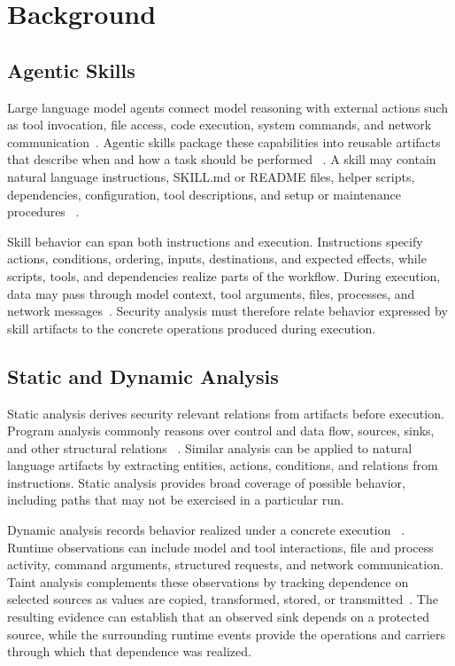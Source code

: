 \section{Background}

\subsection{Agentic Skills}

Large language model agents connect model reasoning with external actions such
as tool invocation, file access, code execution, system commands, and network
communication~\cite{yao2023react,schick2023toolformer,shen2023hugginggpt,
injecagent2024,asb2024}. Agentic skills package these capabilities into reusable
artifacts that describe when and how a task should be performed
~\cite{wang2023voyager,zhou2026comprehensive}. A skill may contain natural
language instructions, SKILL.md or README files, helper scripts, dependencies,
configuration, tool descriptions, and setup or maintenance procedures
~\cite{skillscan2026,skillfortify2026,agentaudit2026}.

Skill behavior can span both instructions and execution. Instructions specify
actions, conditions, ordering, inputs, destinations, and expected effects,
while scripts, tools, and dependencies realize parts of the workflow. During
execution, data may pass through model context, tool arguments, files,
processes, and network messages~\cite{yao2023react,schick2023toolformer}.
Security analysis must therefore relate behavior expressed by skill artifacts
to the concrete operations produced during execution.


\subsection{Static and Dynamic Analysis}

Static analysis derives security relevant relations from artifacts before
execution. Program analysis commonly reasons over control and data flow,
sources, sinks, and other structural relations
~\cite{livshits2005static,tripp2009taj,sui2016svf,yama2014cpg}. Similar
analysis can be applied to natural language artifacts by extracting entities,
actions, conditions, and relations from instructions. Static analysis provides
broad coverage of possible behavior, including paths that may not be exercised
in a particular run.

Dynamic analysis records behavior realized under a concrete execution
~\cite{hossain2017sleuth,pasquier2018camquery,han2020unicorn,
cheng2024kairos}. Runtime observations can include model and tool interactions,
file and process activity, command arguments, structured requests, and network
communication. Taint analysis complements these observations by tracking
dependence on selected sources as values are copied, transformed, stored, or
transmitted~\cite{newsome2005dynamic,schwartz2010all,enck2010taintdroid}.
The resulting evidence can establish that an observed sink depends on a
protected source, while the surrounding runtime events provide the operations
and carriers through which that dependence was realized.


